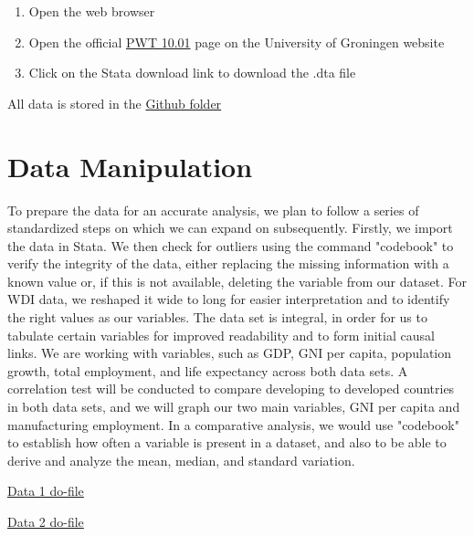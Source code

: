 \documentclass[12pt]{article}
\begin{document}
\begin{enumerate}
\item Open the web browser 

\item Open the official \href{https://www.rug.nl/ggdc/productivity/pwt/?lang=en}{PWT 10.01} page on the University of Groningen website

\item Click on the Stata download link to download the .dta file

\end{enumerate}
All data is stored in the \href{https://github.com/ecn310/course-project-development/issues/12}{Github folder} 



\section{Data Manipulation}
\label{sec:data}

To prepare the data for an accurate analysis, we plan to follow a series of standardized steps on which we can expand on subsequently. Firstly, we import the data in Stata. We then check for outliers using the command "codebook" to verify the integrity of the data, either replacing the missing information with a known value or, if this is not available, deleting the variable from our dataset.  For WDI data, we reshaped it wide to long for easier interpretation and to identify the right values as our variables. 
The data set is integral, in order for us to tabulate certain variables for improved readability and to form initial causal links. We are working with variables, such as GDP, GNI per capita, population growth, total employment, and life expectancy across both data sets. A correlation test will be conducted to compare developing to developed countries in both data sets, and we will graph our two main variables, GNI per capita and manufacturing employment. In a comparative analysis, we would use "codebook" to establish how often a variable is present in a dataset, and also to be able to derive and analyze the mean, median, and standard variation.


\href{https://github.com/ecn310/course-project-development/blob/main/WDI.do}{Data 1 do-file} 

\href{https://github.com/ecn310/course-project-development/blob/main/Penn%20World%20Table%20(PWT)%20version%2010.01.do}{Data 2 do-file} 
\end{document}
